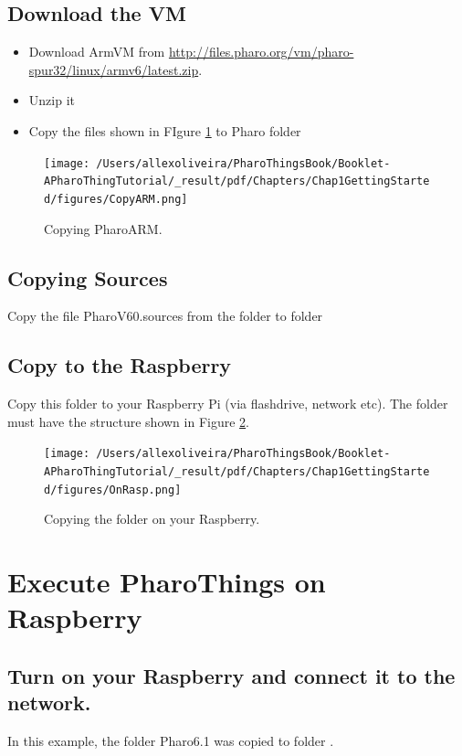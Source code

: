 \documentclass[10pt,twoside,english]{_support/latex/sbabook/sbabook}
\begin{document}
 
\subsection{Download the VM}
\begin{itemize}
\item Download ArmVM from \url{http://files.pharo.org/vm/pharo-spur32/linux/armv6/latest.zip}.
\item Unzip it
\item Copy the files shown in FIgure \ref{CopyARM}  to Pharo folder  
\end{itemize}


\begin{figure}

\begin{center}
\texttt{[image: /Users/allexoliveira/PharoThingsBook/Booklet-APharoThingTutorial/\_result/pdf/Chapters/Chap1GettingStarted/figures/CopyARM.png]}\caption{Copying PharoARM.\label{CopyARM}}\end{center}
\end{figure}

\subsection{Copying Sources}
Copy the file PharoV60.sources from the folder  to folder 
\subsection{Copy to the Raspberry}
Copy this folder to your Raspberry Pi (via flashdrive, network etc). The folder must have the structure shown in Figure \ref{OnRasp}.


\begin{figure}

\begin{center}
\texttt{[image: /Users/allexoliveira/PharoThingsBook/Booklet-APharoThingTutorial/\_result/pdf/Chapters/Chap1GettingStarted/figures/OnRasp.png]}\caption{Copying the folder on your Raspberry.\label{OnRasp}}\end{center}
\end{figure}

\section{Execute PharoThings on Raspberry}\subsection{Turn on your Raspberry and connect it to the network.}
In this example, the folder Pharo6.1 was copied to folder .
\end{document}
